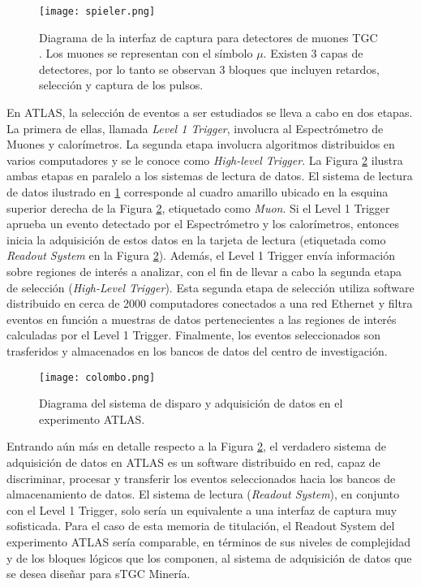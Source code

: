 	\begin{figure}[h]
		\centering
		\texttt{[image: spieler.png]}
		\caption{Diagrama de la interfaz de captura para detectores de muones TGC \cite{Spieler2012ElectronicsAcquisition}. Los muones se representan con el símbolo $\mu$. Existen 3 capas de detectores, por lo tanto se observan 3 bloques que incluyen retardos, selección y captura de los pulsos.}
		\label{fig:spieler}
	\end{figure}

	En ATLAS, la selección de eventos a ser estudiados se lleva a cabo en dos etapas. La primera de ellas, llamada \textit{Level 1 Trigger}, involucra al Espectrómetro de Muones y calorímetros. La segunda etapa involucra algoritmos distribuidos en varios computadores y se le conoce como \textit{High-level Trigger}. La Figura \ref{fig:colombo} ilustra ambas etapas en paralelo a los sistemas de lectura de datos. El sistema de lectura de datos ilustrado en \ref{fig:spieler} corresponde al cuadro amarillo ubicado en la esquina superior derecha de la Figura \ref{fig:colombo}, etiquetado como \textit{Muon}. Si el Level 1 Trigger aprueba un evento detectado por el Espectrómetro y los calorímetros, entonces inicia la adquisición de estos datos en la tarjeta de lectura (etiquetada como \textit{Readout System} en la Figura \ref{fig:colombo}). Además, el Level 1 Trigger envía información sobre regiones de interés a analizar, con el fin de llevar a cabo la segunda etapa de selección (\textit{High-Level Trigger}). Esta segunda etapa de selección utiliza software distribuido en cerca de 2000 computadores conectados a una red Ethernet y filtra eventos en función a muestras de datos pertenecientes a las regiones de interés calculadas por el Level 1 Trigger\cite{Colombo2015Data-flowCase}. Finalmente, los eventos seleccionados son trasferidos y  almacenados en los bancos de datos del centro de investigación.
	
	\begin{figure}[h]
		\centering
		\texttt{[image: colombo.png]}
		\caption{Diagrama del sistema de disparo y adquisición de datos en el experimento ATLAS. \cite{Colombo2015Data-flowCase}}
		\label{fig:colombo}
	\end{figure}
	
	Entrando aún más en detalle respecto a la Figura \ref{fig:colombo}, el verdadero sistema de adquisición de datos en ATLAS es un software distribuido en red\cite{Whiteson2016TheSystem}, capaz de discriminar, procesar y transferir los eventos seleccionados hacia los bancos de almacenamiento de datos. El sistema de lectura (\textit{Readout System}), en conjunto con el Level 1 Trigger, solo sería un equivalente a una interfaz de captura muy sofisticada. Para el caso de esta memoria de titulación, el Readout System del experimento ATLAS sería comparable, en términos de sus niveles de complejidad y de los bloques lógicos que los componen, al sistema de adquisición de datos que se desea diseñar para sTGC Minería.
	
